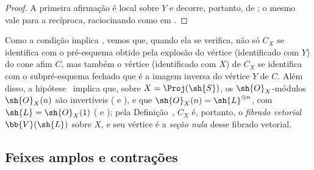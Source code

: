 \documentclass[oneside,10pt]{amsart}
\let\EGAOriginalLabel\label
\renewcommand{\label}[1]{\phantomsection\EGAOriginalLabel{#1}}
\begin{document}
\begin{proof}
A primeira afirmação é local sobre $Y$ e decorre, portanto, de ;
o mesmo vale para a recíproca, raciocinando como em .
\end{proof}
\begin{remark}[8.7.8]
\label{II.8.7.8}
Como a condição  implica , vemos que, quando ela se verifica, não só $C_X$ se identifica com o pré-esquema obtido pela explosão do vértice (identificado com $Y$) do cone afim $C$, mas também o vértice (identificado com $X$) de $C_X$ se identifica com o subpré-esquema fechado que é a imagem inversa do vértice $Y$ de $C$.
Além disso, a hipótese~ implica que, sobre $X=\Proj(\sh{S})$, os $\sh{O}_X$-módulos $\sh{O}_X(n)$ são invertíveis ( e ), e que $\sh{O}_X(n)=\sh{L}^{\otimes n}$, com $\sh{L}=\sh{O}_X(1)$ ( e );
pela Definição~, $C_X$ é, portanto, o \emph{fibrado vetorial} $\bb{V}(\sh{L})$ sobre $X$, e seu vértice é a \emph{seção nula} desse fibrado vetorial.
\end{remark}
\subsection{Feixes amplos e contrações}
\label{subsection:II.8.8}
\end{document}
